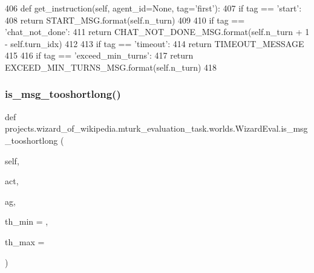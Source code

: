 \begin{DoxyCode}
406     \textcolor{keyword}{def }get\_instruction(self, agent\_id=None, tag='first'):
407         \textcolor{keywordflow}{if} tag == \textcolor{stringliteral}{'start'}:
408             \textcolor{keywordflow}{return} START\_MSG.format(self.n\_turn)
409 
410         \textcolor{keywordflow}{if} tag == \textcolor{stringliteral}{'chat\_not\_done'}:
411             \textcolor{keywordflow}{return} CHAT\_NOT\_DONE\_MSG.format(self.n\_turn + 1 - self.turn\_idx)
412 
413         \textcolor{keywordflow}{if} tag == \textcolor{stringliteral}{'timeout'}:
414             \textcolor{keywordflow}{return} TIMEOUT\_MESSAGE
415 
416         \textcolor{keywordflow}{if} tag == \textcolor{stringliteral}{'exceed\_min\_turns'}:
417             \textcolor{keywordflow}{return} EXCEED\_MIN\_TURNS\_MSG.format(self.n\_turn)
418 
\end{DoxyCode}
\mbox{\label{classprojects_1_1wizard__of__wikipedia_1_1mturk__evaluation__task_1_1worlds_1_1WizardEval_ac6b1cd76a8d7270fb0d879c2ec77abf5}} 
\subsubsection{\texorpdfstring{is\+\_\+msg\+\_\+tooshortlong()}{is\_msg\_tooshortlong()}}
{\footnotesize\ttfamily def projects.\+wizard\+\_\+of\+\_\+wikipedia.\+mturk\+\_\+evaluation\+\_\+task.\+worlds.\+Wizard\+Eval.\+is\+\_\+msg\+\_\+tooshortlong (\begin{DoxyParamCaption}\item[{}]{self,  }\item[{}]{act,  }\item[{}]{ag,  }\item[{}]{th\+\_\+min = {},  }\item[{}]{th\+\_\+max = {} }\end{DoxyParamCaption})}



